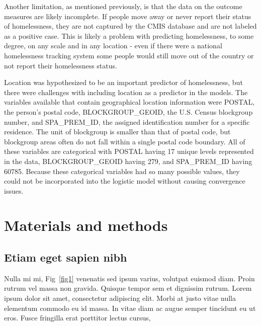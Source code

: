 \documentclass[10pt,letterpaper]{article}
\begin{document}
Another limitation, as mentioned previously, is that the data on the outcome measures are likely incomplete. If people move away or never report their status of homelessness, they are not captured by the CMIS database and are not labeled as a positive case. This is likely a problem with predicting homelessness, to some degree, on any scale and in any location - even if there were a national homelessness tracking system some people would still move out of the country or not report their homelessness status.

Location was hypothesized to be an important predictor of homelessness, but there were challenges with including location as a predictor in the models. The variables available that contain geographical location information were POSTAL, the person's postal code, BLOCKGROUP\_GEOID, the U.S. Census blockgroup number, and SPA\_PREM\_ID, the assigned identification number for a specific residence. The unit of blockgroup is smaller than that of postal code, but blockgroup areas often do not fall within a single postal code boundary. All of these variables are categorical with POSTAL having 17 unique levels represented in the data, BLOCKGROUP\_GEOID having 279, and SPA\_PREM\_ID having 60785. Because these categorical variables had so many possible values, they could not be incorporated into the logistic model without causing convergence issues.







\section*{Materials and methods}
\subsection*{Etiam eget sapien nibh}

Nulla mi mi, Fig~\ref{fig1} venenatis sed ipsum varius, volutpat euismod diam. Proin rutrum vel massa non gravida. Quisque tempor sem et dignissim rutrum. Lorem ipsum dolor sit amet, consectetur adipiscing elit. Morbi at justo vitae nulla elementum commodo eu id massa. In vitae diam ac augue semper tincidunt eu ut eros. Fusce fringilla erat porttitor lectus cursus, %
\end{document}
